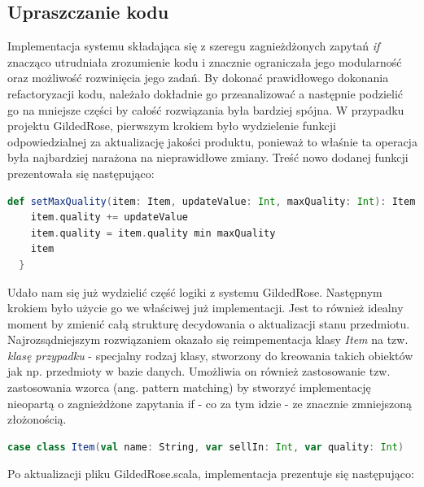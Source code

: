 \documentclass[a4paper, 11pt]{article}
\begin{document}
\subsection{Upraszczanie kodu}
Implementacja systemu składająca się z szeregu zagnieżdżonych zapytań \textit{if} znacząco utrudniała zrozumienie kodu i znacznie ograniczała jego modularność oraz możliwość rozwinięcia jego zadań. 
By dokonać prawidłowego dokonania refactoryzacji kodu, należało dokładnie go przeanalizować a następnie podzielić go na mniejsze części by całość rozwiązania była bardziej spójna.
W przypadku projektu GildedRose, pierwszym krokiem było wydzielenie funkcji odpowiedzialnej za aktualizację jakości produktu, ponieważ to właśnie ta operacja była najbardziej narażona na nieprawidłowe zmiany. Treść nowo dodanej funkcji prezentowała się następująco:
\begin{lstlisting}[language=scala]
  def setMaxQuality(item: Item, updateValue: Int, maxQuality: Int): Item = {
    item.quality += updateValue
    item.quality = item.quality min maxQuality
    item
  }
\end{lstlisting}
Udało nam się już wydzielić część logiki z systemu GildedRose. Następnym krokiem było użycie go we właściwej już implementacji. Jest to również idealny moment by zmienić całą strukturę decydowania o aktualizacji stanu przedmiotu. Najrozsądniejszym rozwiązaniem okazało się reimpementacja klasy \textit{Item} na tzw. \textit{klasę przypadku} - specjalny rodzaj klasy, stworzony do kreowania takich obiektów jak np. przedmioty w bazie danych. Umożliwia on również zastosowanie tzw. zastosowania wzorca (ang. pattern matching) by stworzyć implementację nieopartą o zagnieżdżone zapytania if - co za tym idzie - ze znacznie zmniejszoną złożonością.
\begin{lstlisting}[language=scala]
case class Item(val name: String, var sellIn: Int, var quality: Int)
\end{lstlisting}
Po aktualizacji pliku GildedRose.scala, implementacja prezentuje się następująco:
\end{document}
